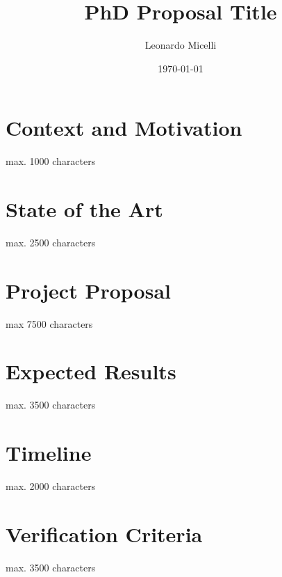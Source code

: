\documentclass[12pt]{article}
\begin{document}
\title{PhD Proposal Title}
\author{Leonardo Micelli}
\date{\today}
\maketitle

\noindent


\newpage
\setcounter{tocdepth}{2}
\tableofcontents

\setlength{\parindent}{0em}
\setlength{\parskip}{1em}


\newpage
\section{Context and Motivation}
max. 1000 characters \cite{dummy2023}

\newpage
\section{State of the Art}
max. 2500 characters

\newpage
\section{Project Proposal}
max 7500 characters

\newpage
\section{Expected Results}
max. 3500 characters

\newpage
\section{Timeline}
max. 2000 characters

\newpage
\section{Verification Criteria}
max. 3500 characters

\clearpage

\renewcommand{\refname}{References}



\end{document}
